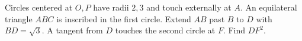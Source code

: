 Circles centered at $O,P$ have radii $2,3$ and touch externally at $A$. An equilateral triangle $ABC$ is inscribed in the first circle. Extend $AB$ past $B$ to $D$ with $BD=\sqrt3$. A tangent from $D$ touches the second circle at $F$. Find $DF^2$.
